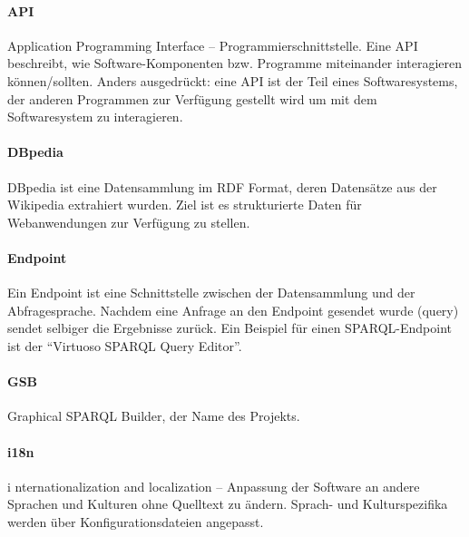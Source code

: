 
\newcommand{\begriff}[2]{
\paragraph{#1}
#2
}


\begriff{API}
{Application Programming Interface -- Programmierschnittstelle.
Eine API be\hack{-\break}schreibt, wie Software-Komponenten bzw. Programme miteinander interagieren können/sollten. Anders ausgedrückt: eine API ist der Teil eines Softwaresystems, der anderen Programmen zur Verfügung gestellt wird um mit dem Softwaresystem zu interagieren.}

\begriff{DBpedia}
{DBpedia ist eine Datensammlung im RDF Format, deren Datensätze aus der Wikipedia extrahiert wurden. Ziel ist es strukturierte Daten für Webanwendungen zur Verfügung zu stellen.
\cite{dbpedia-wikipedia,dbpedia,dbpedia-datasets}
}

\begriff{Endpoint}
{Ein Endpoint ist eine Schnittstelle zwischen der Datensammlung und der 
Abfragesprache. Nachdem eine Anfrage an den Endpoint gesendet wurde (query)  sendet selbiger die Ergebnisse zurück. Ein Beispiel für einen SPARQL-Endpoint ist der “Virtuoso SPARQL Query Editor”. \cite{dbpedia-sparql}}

\begriff{GSB}
{Graphical SPARQL Builder, der Name des Projekts. \cite{swp14-gsb}}

\begriff{i18n} internationalization and localization -- Anpassung der Software an andere Sprachen und Kulturen ohne Quelltext zu ändern. Sprach- und Kulturspezifika werden über Konfigurationsdateien angepasst. 



